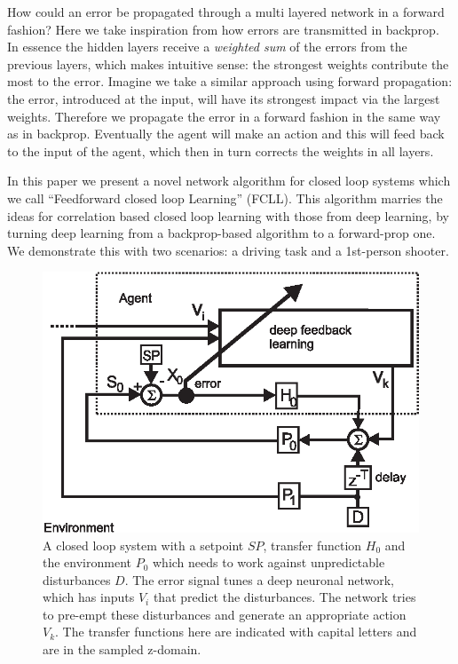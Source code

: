 \documentclass[Afour,sageh,times]{sagej}
\begin{document}
How could an error be propagated through a multi layered network in a forward
fashion? Here we take inspiration from how errors are transmitted in
backprop. In essence the hidden layers receive a \textsl{weighted sum}
of the errors from the previous layers, which makes intuitive sense:
the strongest weights contribute the most to the error. Imagine we
take a similar approach using forward propagation: the error,
introduced at the input, will have its strongest impact via the
largest weights. Therefore we propagate the error in a forward fashion
in the same way as in backprop. Eventually the agent will make an
action and this will feed back to the input of the agent, which then
in turn corrects the weights in all layers.

In this paper we present a novel network algorithm for closed
loop systems which we call ``Feedforward closed loop Learning'' (FCLL). This
algorithm marries the ideas for correlation based closed loop learning
with those from deep learning, by turning deep learning from a
backprop-based algorithm to a forward-prop one. We demonstrate this
with two scenarios: a driving task and a 1st-person shooter.




\begin{figure}[!ht]
  \centering
  \includegraphics[width=0.75\columnwidth]{closed_loop}
  \caption{A closed loop system with a setpoint $SP$, transfer
    function $H_0$ and the environment $P_0$ which needs to work
    against unpredictable disturbances $D$.  The error signal tunes a
    deep neuronal network, which has inputs $V_i$ that predict the
    disturbances. The network tries to pre-empt these disturbances and
    generate an appropriate action $V_k$. The transfer functions here
    are indicated with capital letters and are in the sampled
    z-domain.
    \label{closed_loop}}
\end{figure}
\end{document}
